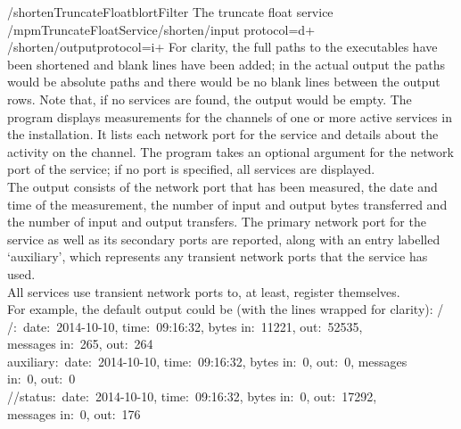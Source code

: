 /shorten\pseudotab{}TruncateFloat\pseudotab{}blort\pseudotab{}Filter\pseudotab{}%
The truncate float service\pseudotwotabs\\
\textellipsis/mpmTruncateFloatService\pseudotab{}/shorten/input\textbraceleft{}%
protocol=d+\textbraceright\pseudotab\\
/shorten/output\textbraceleft{}protocol=i+\textbraceright
\outputEnd{}
For clarity, the full paths to the executables have been shortened and blank lines have
been added; in the actual output the paths would be absolute paths and there would be no
blank lines between the output rows.
Note that, if no services are found, the output would be empty.
The program  displays measurements for the channels of one
or more active services in the \mplusm{} installation.
It lists each \yarp{} network port for the service and details about the activity on the
channel.
The program takes an optional argument for the \yarp{} network port of the service; if no
port is specified, all services are displayed.\\

The output consists of the \yarp{} network port that has been measured, the date and time
of the measurement, the number of input and output bytes transferred and the number of
input and output transfers.
The primary \yarp{} network port for the service as well as its secondary ports are
reported, along with an entry labelled `auxiliary', which represents any transient
\yarp{} network ports that the service has used.\\

All services use transient \yarp{} network ports to, at least, register themselves.\\

For example, the default output could be (with the lines wrapped for clarity):
\outputBegin{}
/\dollarService\\
\settowidth{\uL}{/status}%
\hspace*{\uL}/\dollarService:\ \openSq{}date:\ 2014-10-10, time:\ 09:16:32,
bytes in:\ 11221, out:\ 52535,\\
\settowidth{\uL}{/Service/status: }%
\hspace*{\uL}messages in:\ 265, out:\ 264\closeSq\\
\settowidth{\uL}{/servi}%
\hspace*{\uL}auxiliary:\ \openSq{}date:\ 2014-10-10, time:\ 09:16:32, bytes in:\ 0,
out:\ 0, messages\\
\settowidth{\uL}{/Service/status: }%
\hspace*{\uL}in:\ 0, out:\ 0\closeSq\\
/\dollarService/status:\ \openSq{}date:\ 2014-10-10, time:\ 09:16:32, bytes in:\ 0,
out:\ 17292,\\
\hspace*{\uL}messages in:\ 0, out:\ 176\closeSq\\

